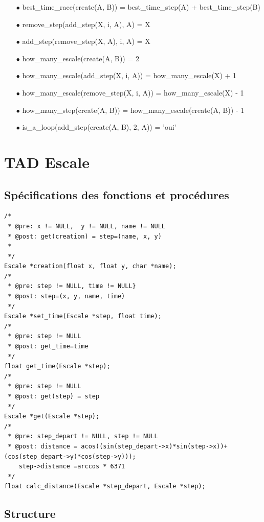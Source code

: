 \documentclass[a4paper, 11pt, oneside]{article}
\begin{document}
    \begin{itemize}
        \item[$\bullet$] best\_time\_race(create(A, B)) = best\_time\_step(A) + best\_time\_step(B)
        \item[$\bullet$] remove\_step(add\_step(X, i, A), A) = X
        \item[$\bullet$] add\_step(remove\_step(X, A), i, A) = X
        \item[$\bullet$] how\_many\_escale(create(A, B)) = 2
        \item[$\bullet$] how\_many\_escale(add\_step(X, i, A)) = how\_many\_escale(X) + 1
        \item[$\bullet$] how\_many\_escale(remove\_step(X, i, A)) = how\_many\_escale(X) - 1
        \item[$\bullet$] how\_many\_step(create(A, B)) = how\_many\_escale(create(A, B)) - 1
        \item[$\bullet$] is\_a\_loop(add\_step(create(A, B), 2, A)) = 'oui'
    \end{itemize}

\section{TAD Escale}

\subsection{Spécifications des fonctions et procédures}

\begin{lstlisting}
/* 
 * @pre: x != NULL,  y != NULL, name != NULL
 * @post: get(creation) = step=(name, x, y) 
 * 
 */
Escale *creation(float x, float y, char *name);
/* 
 * @pre: step != NULL, time != NULL}
 * @post: step=(x, y, name, time)
 */
Escale *set_time(Escale *step, float time);
/* 
 * @pre: step != NULL
 * @post: get_time=time
 */
float get_time(Escale *step);
/* 
 * @pre: step != NULL
 * @post: get(step) = step
 */
Escale *get(Escale *step);
/* 
 * @pre: step_depart != NULL, step != NULL 
 * @post: distance = acos((sin(step_depart->x)*sin(step->x))+(cos(step_depart->y)*cos(step->y)));
    step->distance =arccos * 6371
 */
float calc_distance(Escale *step_depart, Escale *step);
\end{lstlisting}

\subsection{Structure}
\end{document}
